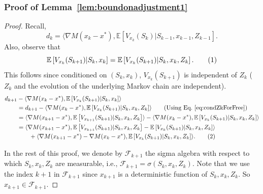 \documentclass{article}
\newcommand{\numberthis}{\addtocounter{equation}{1}\tag{\theequation}}
\newcommand{\lrs}[1]{\left[ #1 \right]}
\newcommand{\E}[1]{\mathbb{E}\lrs{#1}}
\begin{document}
\subsubsection{Proof of Lemma~\ref{lem:boundonadjustment1}}\label{app:proof_lem:boundonadjustment1}
\begin{proof} Recall, 
\[ d_k = \langle \nabla M(x_k - x^*), \E{ V_{x_k}(S_k) | S_{k-1}, x_{k-1}, Z_{k-1} }.\] 
Also, observe that 
\[ \E{V_{x_k}(S_{k+1}) | S_k, x_k }  = \E{ V_{x_k}(S_{k+1}) | S_k, x_k, Z_k }. \numberthis\label{eq:condZkForFree} \]
This follows since conditioned on $(S_k, x_k)$, $V_{x_k}(S_{k+1})$ is independent of $Z_k$ ($Z_k$ and the evolution of the underlying Markov chain are independent). 
    \begin{align*}
        d_{k+1} & - \langle \nabla M(x_k - x^*), \E{ V_{x_k}(S_{k+1}) | S_k, x_k } \rangle\\
        &= d_{k+1} - \langle \nabla M(x_k - x^*), \E{ V_{x_k}(S_{k+1}) | S_k, x_k, Z_k } \rangle \tag{Using Eq.~\eqref{eq:condZkForFree}}\\
        &= \langle \nabla M(x_{k+1} - x^*), \E{V_{x_{k+1}}(S_{k+1}) | S_k, x_k, Z_k} \rangle - \langle \nabla M(x_k - x^*), \E{ V_{x_k}(S_{k+1}) | S_k, x_k, Z_k } \rangle\\
        &= \langle \nabla M(x_{k+1} - x^*), \E{V_{x_{k+1}}(S_{k+1}) | S_k, x_k, Z_k} - \E{ V_{x_k}(S_{k+1}) | S_k, x_k, Z_k }\rangle \\
        &\qquad + \langle \nabla M(x_{k+1} - x^*) - \nabla M(x_k - x^*), \E{ V_{x_k}(S_{k+1}) | S_k, x_k, Z_k } \rangle.\numberthis\label{eq:temp1_T12}
    \end{align*}

    In the rest of this proof, we denote by $\mathcal F_{k+1}$ the sigma algebra with respect to which $S_k, x_k, Z_k$ are measurable, i.e., $\mathcal F_{k+1} = \sigma(S_k, x_k, Z_k)$. Note that we use the index $k+1$ in $\mathcal F_{k+1}$ since $x_{k+1}$ is a deterministic function of $S_k, x_k, Z_k$. So $x_{k+1} \in \mathcal F_{k+1}$.
    

\end{proof}
\end{document}
